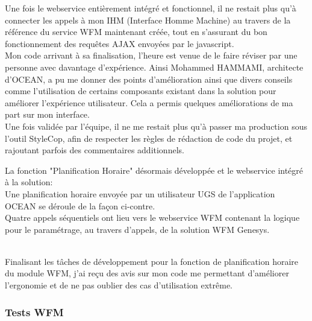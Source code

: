 \documentclass{rapport}
\begin{document}
Une fois le webservice entièrement intégré et fonctionnel, il ne restait plus qu'à connecter les appels à mon IHM (Interface Homme Machine) au travers de la référence du service WFM maintenant créée, tout en s'assurant du bon fonctionnement des requêtes AJAX envoyées par le javascript.\\

Mon code arrivant à sa finalisation, l'heure est venue de le faire réviser par une personne avec davantage d'expérience. Ainsi Mohammed HAMMAMI, architecte d'OCEAN, a pu me donner des points d'amélioration ainsi que divers conseils comme l'utilisation de certains composants existant dans la solution pour améliorer l'expérience utilisateur. Cela a permis quelques améliorations de ma part sur mon interface.\\

Une fois validée par l'équipe, il ne me restait plus qu'à passer ma production sous l'outil StyleCop, afin de respecter les règles de rédaction de code du projet, et rajoutant parfois des commentaires additionnels.\\

\begin{minipage}{0.55\textwidth}
\end{minipage}
\begin{minipage}{0.35\textwidth}
La fonction "Planification Horaire" désormais développée et le webservice intégré à la solution:\\

Une planification horaire envoyée par un utilisateur UGS de l'application OCEAN se déroule de la façon ci-contre.\\

Quatre appels séquentiels ont lieu vers le webservice WFM contenant la logique pour le paramétrage, au travers d'appels, de la solution WFM Genesys.

\end{minipage}
\vspace{5mm} %
\\

Finalisant les tâches de développement pour la fonction de planification horaire du module WFM, j'ai reçu des avis sur mon code me permettant d'améliorer l'ergonomie et de ne pas oublier des cas d'utilisation extrême.

\subsubsection{Tests WFM}
\end{document}
